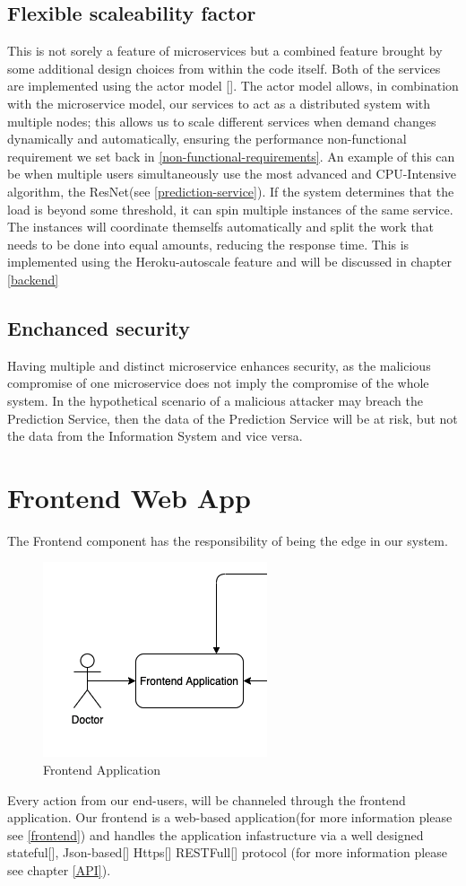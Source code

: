 		\subsection{Flexible scaleability factor}
			This is not sorely a feature of microservices but a combined feature brought by some additional design choices 
			from within the code itself. Both of the services are implemented using the actor model [\cite{hewitt2015actor}]. 
			The actor model allows, in combination with the microservice model, our services to act as a distributed system with 
			multiple nodes; this allows us to scale different services when demand changes dynamically and automatically, ensuring 
			the performance non-functional requirement we set back in \ref{non-functional-requirements}. An example of this can be 
			when multiple users simultaneously use the most advanced and CPU-Intensive algorithm, the ResNet(see \ref{prediction-service}). 
			If the system determines that the load is beyond some threshold, it can spin multiple instances of the same service. 
			The instances will coordinate themselfs automatically and split the work that needs to be done into equal amounts, 
			reducing the response time. This is implemented using the Heroku-autoscale feature and will be discussed in chapter \ref{backend}
		\subsection{Enchanced security}
			Having multiple and distinct microservice enhances security, as the malicious compromise of one microservice does not
			 imply the compromise of the whole system. In the hypothetical scenario of a malicious attacker may breach the 
			 Prediction Service, then the data of the Prediction Service will be at risk, but not the data from the Information 
			 System and vice versa.
	\section{Frontend Web App}
		The Frontend component has the responsibility of being the edge in our system.
		\begin{figure}[H]
			\iftrue
			\caption{Frontend Application}
			\centering
			\includegraphics[scale=0.5]{figures/frontend}
			\fi
		\end{figure}
		Every action from our end-users, will be channeled through the frontend application. Our frontend is a web-based application(for 
		more information please see \ref{frontend}) and handles the application infastructure via a well designed stateful[\cite{session-rfc6265}],
		Json-based[\cite{json-rfc7159}] Https[\cite{rfc2818}] RESTFull[\cite{restful-rfc7231}]
		protocol (for more information please see chapter \ref{API}).
